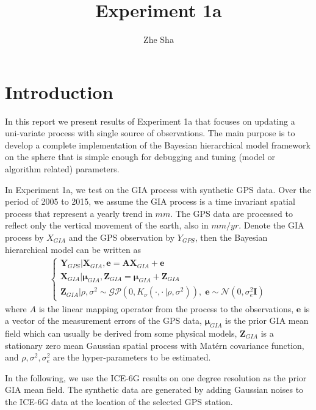 \documentclass[a4paper,12pt]{article}
\begin{document}
\title{Experiment 1a}
\author{Zhe Sha}
\maketitle

\onehalfspacing
{}

\section{Introduction}
In this report we present results of Experiment 1a that focuses on updating a uni-variate process with single source of observations. The main purpose is to develop a complete implementation of the Bayesian hierarchical model framework on the sphere that is simple enough for debugging and tuning (model or algorithm related) parameters.

In Experiment 1a, we test on the GIA process with synthetic GPS data. Over the period of 2005 to 2015, we assume the GIA process is a time invariant spatial process that represent a yearly trend in $mm$. The GPS data are processed to reflect only the vertical movement of the earth, also in $mm/yr$. Denote the GIA process by $X_{GIA}$ and the GPS observation by $Y_{GPS}$, then the Bayesian hierarchical model can be written as
\begin{align}
\left\{\begin{array}{l}
\bm{Y}_{GPS} | \bm{X}_{GIA}, \bm{e} = \bm{A} \bm{X}_{GIA} + \bm{e} \\
\bm{X}_{GIA} | \bm{\mu}_{GIA}, \bm{Z}_{GIA} = \bm{\mu}_{GIA} + \bm{Z}_{GIA} \\
\bm{Z}_{GIA} | \rho, \sigma^2 \sim \mathcal{GP}(0, K_{\nu}(\cdot, \cdot \, | \rho, \sigma^2)),  \; \bm{e} \sim \mathcal{N} (0, \sigma_e^2 \bm{I})
\end{array}
\right.
\end{align} 
where $A$ is the linear mapping operator from the process to the observations, $\bm{e}$ is a vector of the measurement errors of the GPS data, $\bm{\mu}_{GIA}$ is the prior GIA mean field which can usually be derived from some physical models, $\bm{Z}_{GIA}$ is a stationary zero mean Gaussian spatial process with Mat\'{e}rn covariance function, and $\rho, \sigma^2, \sigma_e^2$ are the hyper-parameters to be estimated.   

In the following, we use the ICE-6G results on one degree resolution as the prior GIA mean field. The synthetic data are generated by adding Gaussian noises to the ICE-6G data at the location of the selected GPS station. 
\end{document}
